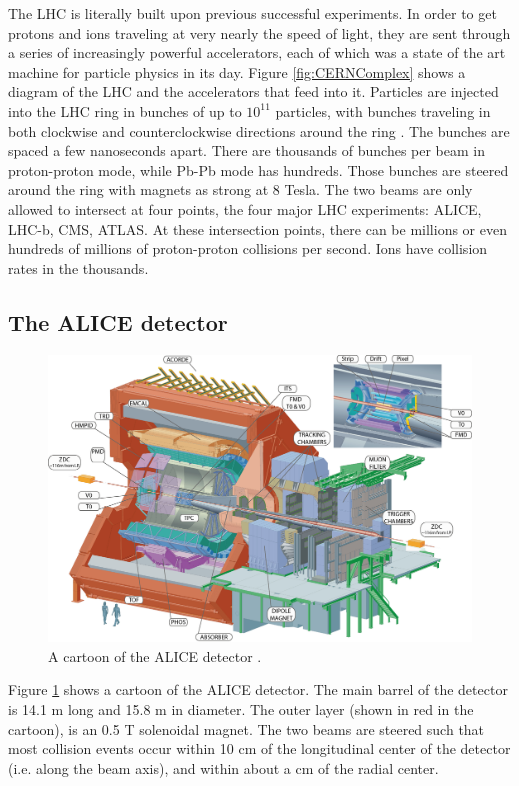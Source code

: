 The LHC is literally built upon previous successful experiments. 
In order to get protons and ions traveling at very nearly the speed of light, they are sent through a series of increasingly powerful accelerators, each of which was a state of the art machine for particle physics in its day.
Figure \ref{fig:CERNComplex} shows a diagram of the LHC and the accelerators that feed into it.
Particles are injected into the LHC ring in bunches of up to $10^{11}$ particles, with bunches traveling in both clockwise and counterclockwise directions around the ring \cite{Lefevre:1092437}.
The bunches are spaced a few nanoseconds apart.
There are thousands of bunches per beam in proton-proton mode, while Pb-Pb mode has hundreds.
Those bunches are steered around the ring with magnets as strong at 8 Tesla.
The two beams are only allowed to intersect at four points, the four major LHC experiments: ALICE, LHC-b, CMS, ATLAS.
At these intersection points, there can be millions or even hundreds of millions of proton-proton collisions per second.
Ions have collision rates in the thousands.
 
\subsection{The ALICE detector}
\label{sec:ALICEDetector}

 
\begin{figure}[hbt]
\includegraphics[width=36pc]{Figures/BorrowedFigures/ALICEDetector.jpg}
\caption[Cartoon of the ALICE detector]{A cartoon of the ALICE detector \cite{Aamodt:2008zz}.}
\label{fig:ALICEDetector}
\end{figure}
Figure \ref{fig:ALICEDetector} shows a cartoon of the ALICE detector.
The main barrel of the detector is 14.1 m long and 15.8 m in diameter. The outer layer (shown in red in the cartoon), is an 0.5 T solenoidal magnet.
The two beams are steered such that most collision events occur within 10 cm of the longitudinal center of the detector (i.e. along the beam axis), and within about a cm of the radial center.

